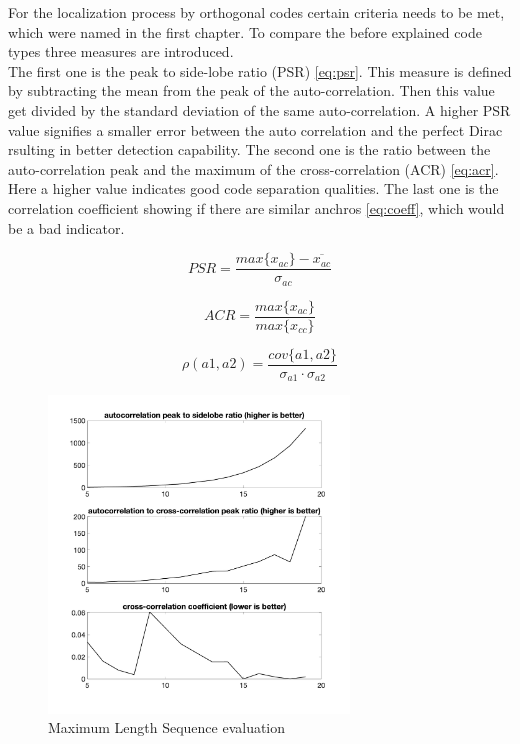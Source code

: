 For the localization process by orthogonal codes certain criteria needs to be met, which were named in the first chapter. To compare the before explained code types three measures are introduced. \\ 
The first one is the peak to side-lobe ratio (PSR) \ref{eq:psr}. This measure is defined by subtracting the mean from the peak of the auto-correlation. Then this value get divided by the standard deviation of the same auto-correlation. A higher PSR value signifies a smaller error between the auto correlation and the perfect Dirac rsulting in better detection capability. The second one is the ratio between the auto-correlation peak and the maximum of the cross-correlation (ACR) \ref{eq:acr}. Here a higher value indicates good code separation qualities. The last one is the correlation coefficient showing if there are similar anchros \ref{eq:coeff}, which would be a bad indicator.

\begin{equation}
PSR=\dfrac{max\{x_{ac}\}-\overline{x_{ac}}}{\sigma_{ac}}
\label{eq:psr}
\end{equation}

\begin{equation}
ACR=\dfrac{max\{x_{ac}\}}{max\{{x_{cc}\}}}
\label{eq:acr}
\end{equation}

\begin{equation}
\rho(a1,a2)=\dfrac{cov\{a1,a2\}}{\sigma_{a1}\cdot\sigma_{a2}}
\label{eq:coeff}
\end{equation}
\begin{figure}[h]
	\includegraphics[width=8cm]{images/matlabplots/mseq}

	\caption{Maximum Length Sequence evaluation}
\end{figure}

